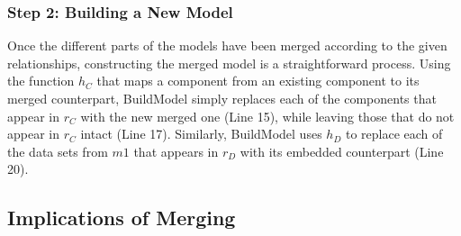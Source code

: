 
\subsubsection{Step 2: Building a New Model}

Once the different parts of the models have been merged according to
the given relationships, constructing the merged model is a
straightforward process. Using the function $h_{C}$ that maps a component
from an existing component to its merged counterpart, \textsf{BuildModel}
simply replaces each of the components that appear in $r_{C}$ with the
new merged one (Line 15), while leaving those that do not appear in
$r_{C}$ intact (Line 17). Similarly, \textsf{BuildModel} uses $h_{D}$
to replace each of the data sets from $m1$ that appears in $r_{D}$
with its embedded counterpart (Line 20).  

\subsection{Implications of Merging}

